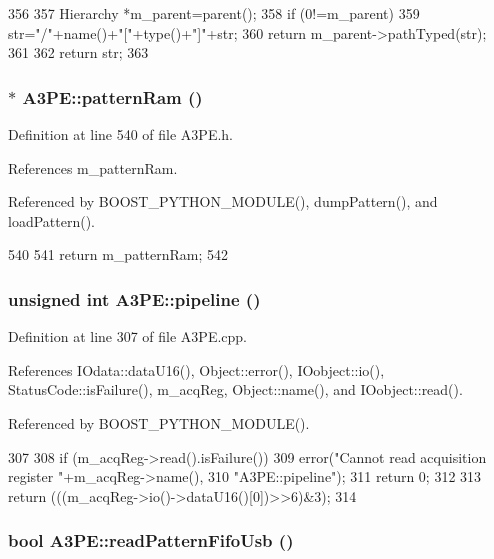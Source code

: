 \begin{DoxyCode}
356                                            {
357   Hierarchy *m_parent=parent();
358   if (0!=m_parent){
359     str="/"+name()+"["+type()+"]"+str;
360     return m_parent->pathTyped(str);
361   }
362   return str;
363 }
\end{DoxyCode}
\hypertarget{classA3PE_a94ef54086baa29f7f6638c13d8906e56}{
\subsubsection[{patternRam}]{$\ast$ A3PE::patternRam ()}}
\label{classA3PE_a94ef54086baa29f7f6638c13d8906e56}


Definition at line 540 of file A3PE.h.

References m\_\-patternRam.

Referenced by BOOST\_\-PYTHON\_\-MODULE(), dumpPattern(), and loadPattern().


\begin{DoxyCode}
540                    {
541     return m_patternRam;
542   }
\end{DoxyCode}
\hypertarget{classA3PE_aeb22b2fcba4d14f234ad2d6dcef7948c}{
\subsubsection[{pipeline}]{\setlength{\rightskip}{0pt plus 5cm}unsigned int A3PE::pipeline ()}}
\label{classA3PE_aeb22b2fcba4d14f234ad2d6dcef7948c}


Definition at line 307 of file A3PE.cpp.

References IOdata::dataU16(), Object::error(), IOobject::io(), StatusCode::isFailure(), m\_\-acqReg, Object::name(), and IOobject::read().

Referenced by BOOST\_\-PYTHON\_\-MODULE().


\begin{DoxyCode}
307                            {
308   if (m_acqReg->read().isFailure()){
309     error("Cannot read acquisition register "+m_acqReg->name(),
310       "A3PE::pipeline");
311     return 0;
312   }
313   return (((m_acqReg->io()->dataU16()[0])>>6)&3);
314 }
\end{DoxyCode}
\hypertarget{classA3PE_a3bb47f43f9f98d8a0d825aadc04e5ab6}{
\subsubsection[{readPatternFifoUsb}]{\setlength{\rightskip}{0pt plus 5cm}bool A3PE::readPatternFifoUsb ()}}
\label{classA3PE_a3bb47f43f9f98d8a0d825aadc04e5ab6}


